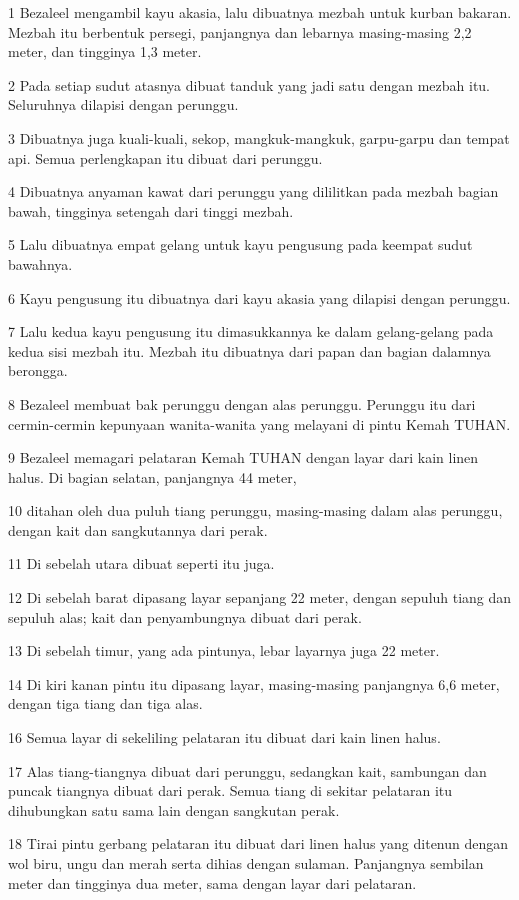 \par 1 Bezaleel mengambil kayu akasia, lalu dibuatnya mezbah untuk kurban bakaran. Mezbah itu berbentuk persegi, panjangnya dan lebarnya masing-masing 2,2 meter, dan tingginya 1,3 meter.
\par 2 Pada setiap sudut atasnya dibuat tanduk yang jadi satu dengan mezbah itu. Seluruhnya dilapisi dengan perunggu.
\par 3 Dibuatnya juga kuali-kuali, sekop, mangkuk-mangkuk, garpu-garpu dan tempat api. Semua perlengkapan itu dibuat dari perunggu.
\par 4 Dibuatnya anyaman kawat dari perunggu yang dililitkan pada mezbah bagian bawah, tingginya setengah dari tinggi mezbah.
\par 5 Lalu dibuatnya empat gelang untuk kayu pengusung pada keempat sudut bawahnya.
\par 6 Kayu pengusung itu dibuatnya dari kayu akasia yang dilapisi dengan perunggu.
\par 7 Lalu kedua kayu pengusung itu dimasukkannya ke dalam gelang-gelang pada kedua sisi mezbah itu. Mezbah itu dibuatnya dari papan dan bagian dalamnya berongga.
\par 8 Bezaleel membuat bak perunggu dengan alas perunggu. Perunggu itu dari cermin-cermin kepunyaan wanita-wanita yang melayani di pintu Kemah TUHAN.
\par 9 Bezaleel memagari pelataran Kemah TUHAN dengan layar dari kain linen halus. Di bagian selatan, panjangnya 44 meter,
\par 10 ditahan oleh dua puluh tiang perunggu, masing-masing dalam alas perunggu, dengan kait dan sangkutannya dari perak.
\par 11 Di sebelah utara dibuat seperti itu juga.
\par 12 Di sebelah barat dipasang layar sepanjang 22 meter, dengan sepuluh tiang dan sepuluh alas; kait dan penyambungnya dibuat dari perak.
\par 13 Di sebelah timur, yang ada pintunya, lebar layarnya juga 22 meter.
\par 14 Di kiri kanan pintu itu dipasang layar, masing-masing panjangnya 6,6 meter, dengan tiga tiang dan tiga alas.
\par 16 Semua layar di sekeliling pelataran itu dibuat dari kain linen halus.
\par 17 Alas tiang-tiangnya dibuat dari perunggu, sedangkan kait, sambungan dan puncak tiangnya dibuat dari perak. Semua tiang di sekitar pelataran itu dihubungkan satu sama lain dengan sangkutan perak.
\par 18 Tirai pintu gerbang pelataran itu dibuat dari linen halus yang ditenun dengan wol biru, ungu dan merah serta dihias dengan sulaman. Panjangnya sembilan meter dan tingginya dua meter, sama dengan layar dari pelataran.
